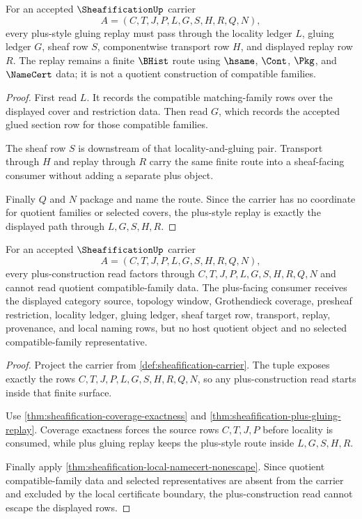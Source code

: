 \begin{theorem}
\label{thm:sheafification-plus-gluing-replay}
For an accepted $\SheafificationUp$ carrier
$$
A=(C,T,J,P,L,G,S,H,R,Q,N),
$$
every plus-style gluing replay must pass through the locality ledger $L$, gluing ledger $G$, sheaf row $S$, componentwise transport row $H$, and displayed replay row $R$. The replay remains a finite $\BHist$ route using $\hsame$, $\Cont$, $\Pkg$, and $\NameCert$ data; it is not a quotient construction of compatible families.
\end{theorem}
\begin{proof}
First read $L$. It records the compatible matching-family rows over the displayed cover and restriction data. Then read $G$, which records the accepted glued section row for those compatible families.

The sheaf row $S$ is downstream of that locality-and-gluing pair. Transport through $H$ and replay through $R$ carry the same finite route into a sheaf-facing consumer without adding a separate plus object.

Finally $Q$ and $N$ package and name the route. Since the carrier has no coordinate for quotient families or selected covers, the plus-style replay is exactly the displayed path through $L,G,S,H,R$.
\end{proof}

\begin{theorem}
\label{thm:sheafification-plus-construction-boundary}
For an accepted $\SheafificationUp$ carrier
$$
A=(C,T,J,P,L,G,S,H,R,Q,N),
$$
every plus-construction read factors through $C,T,J,P,L,G,S,H,R,Q,N$ and cannot read quotient compatible-family data. The plus-facing consumer receives the displayed category source, topology window, Grothendieck coverage, presheaf restriction, locality ledger, gluing ledger, sheaf target row, transport, replay, provenance, and local naming rows, but no host quotient object and no selected compatible-family representative.
\end{theorem}
\begin{proof}
Project the carrier from \autoref{def:sheafification-carrier}. The tuple exposes exactly the rows $C,T,J,P,L,G,S,H,R,Q,N$, so any plus-construction read starts inside that finite surface.

Use \autoref{thm:sheafification-coverage-exactness} and \autoref{thm:sheafification-plus-gluing-replay}. Coverage exactness forces the source rows $C,T,J,P$ before locality is consumed, while plus gluing replay keeps the plus-style route inside $L,G,S,H,R$.

Finally apply \autoref{thm:sheafification-local-namecert-nonescape}. Since quotient compatible-family data and selected representatives are absent from the carrier and excluded by the local certificate boundary, the plus-construction read cannot escape the displayed rows.
\end{proof}


